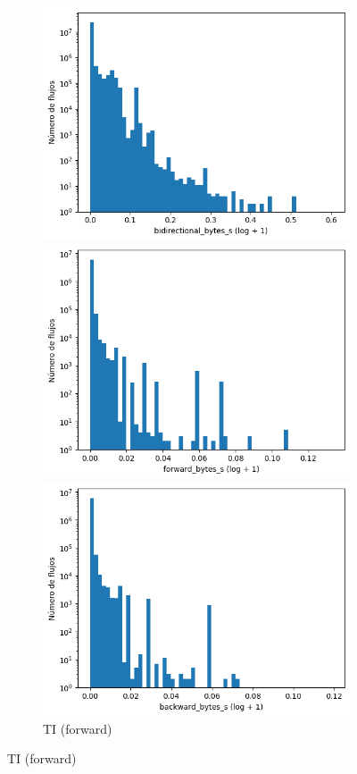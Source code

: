 \begin{figure}[H]
\begin{subfigure}[b]{0.26\textwidth}
        \includegraphics[width=\linewidth]{media/packet_pincer_toniot/bidirectional_bytes_s_log_x_log_y.png}
        \caption{TI (bidir.)}
        \includegraphics[width=\textwidth]{media/packet_pincer_botiot/forward_bytes_s_log_x_log_y.png}
        \caption{TI (forward)}
        \includegraphics[width=\textwidth]{media/packet_pincer_botiot/backward_bytes_s_log_x_log_y.png}

\end{subfigure}
\end{figure}
